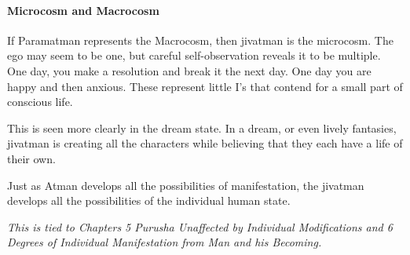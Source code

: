 \paragraph{Microcosm and Macrocosm}
If Paramatman represents the Macrocosm, then jivatman is the microcosm. The ego may seem to be one, but careful self-observation reveals it to be multiple. One day, you make a resolution and break it the next day. One day you are happy and then anxious. These represent little I’s that contend for a small part of conscious life.

This is seen more clearly in the dream state. In a dream, or even lively fantasies, jivatman is creating all the characters while believing that they each have a life of their own.

Just as Atman develops all the possibilities of manifestation, the jivatman develops all the possibilities of the individual human state.


\textit{This is tied to Chapters 5 \emph{Purusha Unaffected by Individual Modifications} and 6 \emph{Degrees of Individual Manifestation} from \emph{Man and his Becoming}.}

